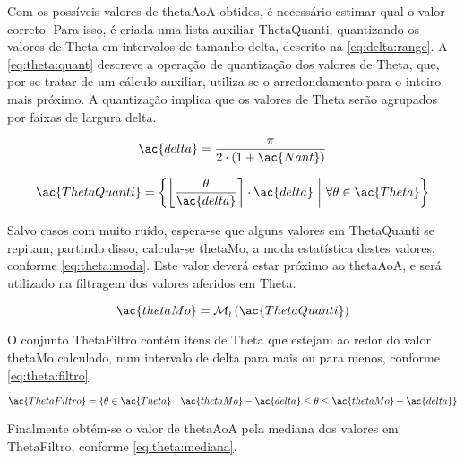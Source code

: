 
Com os possíveis valores de \ac{thetaAoA} obtidos, é necessário estimar qual o valor correto.
Para isso, é criada uma lista auxiliar \ac{ThetaQuanti}, quantizando os valores de \ac{Theta} em intervalos de tamanho \ac{delta}, descrito na \autoref{eq:delta:range}.
A \autoref{eq:theta:quant} descreve a operação de quantização dos valores de \ac{Theta}, que, por se tratar de um cálculo auxiliar, utiliza-se o arredondamento para o inteiro mais próximo.
A quantização implica que os valores de \ac{Theta} serão agrupados por faixas de largura \ac{delta}.

\begin{equation} \label{eq:delta:range}
    \ac{delta} = \frac{\pi}{2 \cdot \left( 1 + \ac{Nant} \right)}
\end{equation}

\begin{equation} \label{eq:theta:quant}
    \ac{ThetaQuanti} =
    \left\{\left\lfloor\frac{\theta}{\ac{delta}}\right\rceil\cdot\ac{delta} ~\middle\vert~ \forall \theta \in \ac{Theta}  \right\}
\end{equation}

Salvo casos com muito ruído, espera-se que alguns valores em \ac{ThetaQuanti} se repitam, partindo disso, calcula-se \ac{thetaMo}, a moda estatística destes valores, conforme \autoref{eq:theta:moda}.
Este valor deverá estar próximo ao \ac{thetaAoA}, e será utilizado na filtragem dos valores aferidos em \ac{Theta}.

\begin{equation} \label{eq:theta:moda}
    \ac{thetaMo} = \operatorname{\mathcal{M_o}}\left( \ac{ThetaQuanti}  \right)
\end{equation}

O conjunto \ac{ThetaFiltro} contém itens de \ac{Theta} que estejam ao redor do valor \ac{thetaMo} calculado, num intervalo de \ac{delta} para mais ou para menos, conforme \autoref{eq:theta:filtro}.


\begin{equation} \label{eq:theta:filtro}
    \ac{ThetaFiltro} = \left\{\theta \in \ac{Theta}  ~\middle\vert~
    \ac{thetaMo} - \ac{delta} \leq \theta \leq \ac{thetaMo} + \ac{delta}\right\}
\end{equation}

Finalmente obtém-se o valor de \ac{thetaAoA} pela mediana dos valores em \ac{ThetaFiltro}, conforme \autoref{eq:theta:mediana}.

